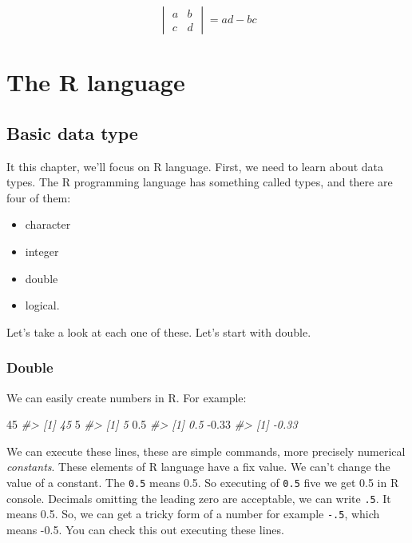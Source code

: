 \documentclass[
]{book}
\newenvironment{Shaded}{\begin{snugshade}}{\end{snugshade}}
\newcommand{\CommentTok}[1]{\textcolor[rgb]{0.56,0.35,0.01}{\textit{#1}}}
\newcommand{\DecValTok}[1]{\textcolor[rgb]{0.00,0.00,0.81}{#1}}
\newcommand{\FloatTok}[1]{\textcolor[rgb]{0.00,0.00,0.81}{#1}}
\newcommand{\SpecialCharTok}[1]{\textcolor[rgb]{0.00,0.00,0.00}{#1}}
\providecommand{\tightlist}{%
  \setlength{\itemsep}{0pt}\setlength{\parskip}{0pt}}
\begin{document}
\[\begin{vmatrix}a & b\\
c & d
\end{vmatrix}=ad-bc\]

\hypertarget{the-r-language}{%
\chapter{The R language}\label{the-r-language}}

\hypertarget{basic-data-type}{%
\section{Basic data type}\label{basic-data-type}}

It this chapter, we'll focus on R language. First, we need to learn about data types. The R programming language has something called types, and there are four of them:

\begin{itemize}
\tightlist
\item
  character
\item
  integer
\item
  double
\item
  logical.
\end{itemize}

Let's take a look at each one of these. Let's start with double.

\hypertarget{double}{%
\subsection{Double}\label{double}}

We can easily create numbers in R. For example:

\begin{Shaded}
\begin{Highlighting}[]
\DecValTok{45}
\CommentTok{\#\textgreater{} [1] 45}
\DecValTok{5}
\CommentTok{\#\textgreater{} [1] 5}
\FloatTok{0.5}
\CommentTok{\#\textgreater{} [1] 0.5}
\SpecialCharTok{{-}}\FloatTok{0.33}
\CommentTok{\#\textgreater{} [1] {-}0.33}
\end{Highlighting}
\end{Shaded}

We can execute these lines, these are simple commands, more precisely numerical \emph{constants}. These elements of R language have a fix value. We can't change the value of a constant. The \texttt{0.5} means 0.5. So executing of \texttt{0.5} five we get 0.5 in R console. Decimals omitting the leading zero are acceptable, we can write \texttt{.5}. It means 0.5. So, we can get a tricky form of a number for example \texttt{-.5}, which means -0.5. You can check this out executing these lines.
\end{document}
